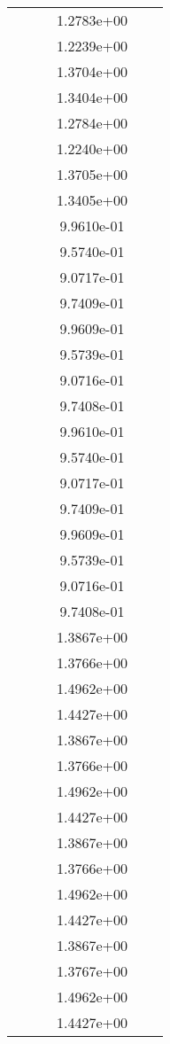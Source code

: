 \begin{xltabular}{\textwidth}{r|rS[table-format=1.3e+2]S[table-format=1.4e+2]S[table-format=1.4e+2]S[table-format=-1.5]}
&  &  & 1.2783e+00 & & \\
&  &  & 1.2239e+00 & & \\
&  &  & 1.3704e+00 & & \\
&  &  & 1.3404e+00 & & \\
&  &  & 1.2784e+00 & & \\
&  &  & 1.2240e+00 & & \\
&  &  & 1.3705e+00 & & \\
&  &  & 1.3405e+00 & & \\
&  &  & 9.9610e-01 & & \\
&  &  & 9.5740e-01 & & \\
&  &  & 9.0717e-01 & & \\
&  &  & 9.7409e-01 & & \\
&  &  & 9.9609e-01 & & \\
&  &  & 9.5739e-01 & & \\
&  &  & 9.0716e-01 & & \\
&  &  & 9.7408e-01 & & \\
&  &  & 9.9610e-01 & & \\
&  &  & 9.5740e-01 & & \\
&  &  & 9.0717e-01 & & \\
&  &  & 9.7409e-01 & & \\
&  &  & 9.9609e-01 & & \\
&  &  & 9.5739e-01 & & \\
&  &  & 9.0716e-01 & & \\
&  &  & 9.7408e-01 & & \\
&  &  & 1.3867e+00 & & \\
&  &  & 1.3766e+00 & & \\
&  &  & 1.4962e+00 & & \\
&  &  & 1.4427e+00 & & \\
&  &  & 1.3867e+00 & & \\
&  &  & 1.3766e+00 & & \\
&  &  & 1.4962e+00 & & \\
&  &  & 1.4427e+00 & & \\
&  &  & 1.3867e+00 & & \\
&  &  & 1.3766e+00 & & \\
&  &  & 1.4962e+00 & & \\
&  &  & 1.4427e+00 & & \\
&  &  & 1.3867e+00 & & \\
&  &  & 1.3767e+00 & & \\
&  &  & 1.4962e+00 & & \\
&  &  & 1.4427e+00 & & \\

\end{xltabular}
